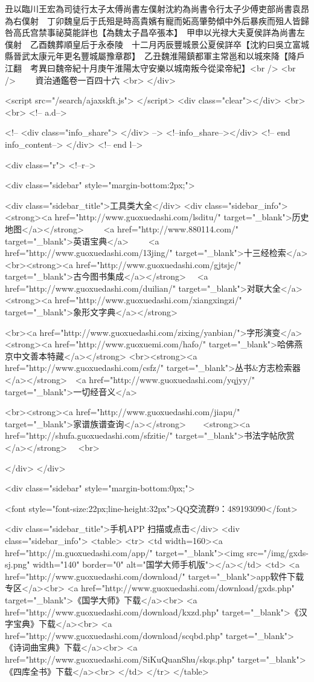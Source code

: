 丑以臨川王宏為司徒行太子太傅尚書左僕射沈約為尚書令行太子少傅吏部尚書袁昂為右僕射　丁卯魏皇后于氏殂是時高貴嬪有寵而妬高肇勢傾中外后暴疾而殂人皆歸咎高氏宫禁事祕莫能詳也【為魏太子昌卒張本】　甲申以光禄大夫夏侯詳為尚書左僕射　乙酉魏葬順皇后于永泰陵　十二月丙辰豐城景公夏侯詳卒【沈約曰吳立富城縣晉武太康元年更名豐城屬豫章郡】　乙丑魏淮陽鎮都軍主常邕和以城來降【降戶江翻　考異曰魏帝紀十月庚午淮陽太守安樂以城南叛今從梁帝紀】<br />
<br />
　　資治通鑑卷一百四十六  <br>
   </div> 

<script src="/search/ajaxskft.js"> </script>
 <div class="clear"></div>
<br>
<br>
 <!-- a.d-->

 <!--
<div class="info_share">
</div> 
-->
 <!--info_share--></div>   <!-- end info_content-->
  </div> <!-- end l-->

<div class="r">   <!--r-->



<div class="sidebar"  style="margin-bottom:2px;">

 
<div class="sidebar_title">工具类大全</div>
<div class="sidebar_info">
<strong><a href="http://www.guoxuedashi.com/lsditu/" target="_blank">历史地图</a></strong>　　
<a href="http://www.880114.com/" target="_blank">英语宝典</a>　　
<a href="http://www.guoxuedashi.com/13jing/" target="_blank">十三经检索</a>　
<br><strong><a href="http://www.guoxuedashi.com/gjtsjc/" target="_blank">古今图书集成</a></strong>　
<a href="http://www.guoxuedashi.com/duilian/" target="_blank">对联大全</a>　<strong><a href="http://www.guoxuedashi.com/xiangxingzi/" target="_blank">象形文字典</a></strong>　

<br><a href="http://www.guoxuedashi.com/zixing/yanbian/">字形演变</a>　　<strong><a href="http://www.guoxuemi.com/hafo/" target="_blank">哈佛燕京中文善本特藏</a></strong>
<br><strong><a href="http://www.guoxuedashi.com/csfz/" target="_blank">丛书&方志检索器</a></strong>　<a href="http://www.guoxuedashi.com/yqjyy/" target="_blank">一切经音义</a>　　

<br><strong><a href="http://www.guoxuedashi.com/jiapu/" target="_blank">家谱族谱查询</a></strong>　　<strong><a href="http://shufa.guoxuedashi.com/sfzitie/" target="_blank">书法字帖欣赏</a></strong>　
<br>

</div>
</div>


<div class="sidebar" style="margin-bottom:0px;">

<font style="font-size:22px;line-height:32px">QQ交流群9：489193090</font>


<div class="sidebar_title">手机APP 扫描或点击</div>
<div class="sidebar_info">
<table>
<tr>
	<td width=160><a href="http://m.guoxuedashi.com/app/" target="_blank"><img src="/img/gxds-sj.png" width="140"  border="0" alt="国学大师手机版"></a></td>
	<td>
<a href="http://www.guoxuedashi.com/download/" target="_blank">app软件下载专区</a><br>
<a href="http://www.guoxuedashi.com/download/gxds.php" target="_blank">《国学大师》下载</a><br>
<a href="http://www.guoxuedashi.com/download/kxzd.php" target="_blank">《汉字宝典》下载</a><br>
<a href="http://www.guoxuedashi.com/download/scqbd.php" target="_blank">《诗词曲宝典》下载</a><br>
<a href="http://www.guoxuedashi.com/SiKuQuanShu/skqs.php" target="_blank">《四库全书》下载</a><br>
</td>
</tr>
</table>

